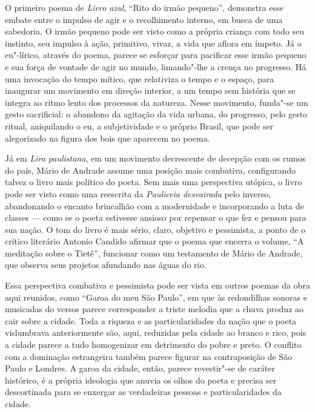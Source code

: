 O primeiro poema de \textit{Livro azul}, ``Rito do irmão pequeno'', demonstra esse embate entre o impulso de agir e o recolhimento interno, em busca de uma sabedoria. O irmão pequeno pode ser visto como a própria criança com todo seu instinto, seu impulso à ação, primitivo, vivaz, a vida que aflora em ímpeto. Já o eu"-lírico, através do poema, parece se esforçar para pacificar esse irmão pequeno e sua força de vontade de agir no mundo, limando"-lhe a crença no progresso.
Há uma invocação do tempo mítico, que relativiza o tempo e o espaço, para inaugurar um movimento em direção interior, a um tempo sem história que se integra ao ritmo lento dos processos da natureza. Nesse movimento, funda"-se um gesto sacrificial: o abandono da agitação da vida urbana, do progresso, pelo gesto ritual, aniquilando o eu, a subjetividade e o próprio Brasil, que pode ser alegorizado na figura dos bois que aparecem no poema.

Já em \textit{Lira paulistana}, em um movimento decrescente de decepção com os rumos do país, Mário de Andrade assume uma posição mais combativa, configurando talvez o livro mais político do poeta. Sem mais uma perspectiva utópica, o livro pode ser visto como uma reescrita da \textit{Pauliceia desvairada} pelo inverso, abandonando o encanto brincalhão com a modernidade e incorporando a luta de classes --- como se o poeta estivesse ansioso por repensar o que fez e pensou para sua nação. O tom do livro é mais sério, claro, objetivo e pessimista, a ponto de o crítico literário Antonio Candido afirmar que o poema que encerra o volume, ``A meditação sobre o Tietê'', funcionar como um testamento de Mário de Andrade, que observa seus projetos afundando nas águas do rio.

Essa perspectiva combativa e pessimista pode ser vista em outros poemas da obra aqui reunidos, como ``Garoa do meu São Paulo'', em que às redondilhas sonoras e musicadas do versos parece corresponder a triste melodia que a chuva produz ao cair sobre a cidade. Toda a riqueza e as particularidades da nação que o poeta vislumbrava anteriormente são, aqui, reduzidas pela cidade ao branco e rico, pois a cidade parece a tudo homogenizar em detrimento do pobre e preto. O conflito com a dominação estrangeira também parece figurar na contraposição de São Paulo e Londres.
A garoa da cidade, então, parece revestir"-se de caráter histórico, é a própria ideologia que anuvia os olhos do poeta e precisa ser descortinada para se enxergar as verdadeiras pessoas e particularidades da cidade.


